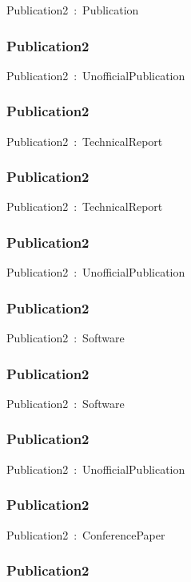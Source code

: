 \documentclass{article}
\begin{document}
Publication2~:~Publication

\subsubsection*{Publication2}

Publication2~:~UnofficialPublication

\subsubsection*{Publication2}

Publication2~:~TechnicalReport

\subsubsection*{Publication2}

Publication2~:~TechnicalReport

\subsubsection*{Publication2}

Publication2~:~UnofficialPublication

\subsubsection*{Publication2}

Publication2~:~Software

\subsubsection*{Publication2}

Publication2~:~Software

\subsubsection*{Publication2}

Publication2~:~UnofficialPublication

\subsubsection*{Publication2}

Publication2~:~ConferencePaper

\subsubsection*{Publication2}
\end{document}
